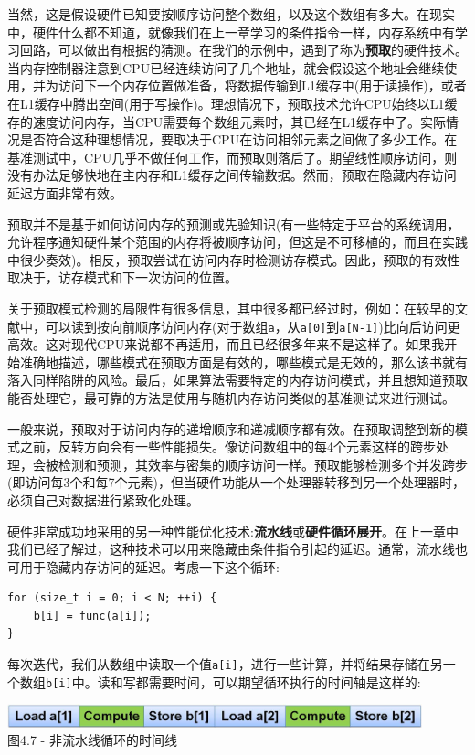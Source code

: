 当然，这是假设硬件已知要按顺序访问整个数组，以及这个数组有多大。在现实中，硬件什么都不知道，就像我们在上一章学习的条件指令一样，内存系统中有学习回路，可以做出有根据的猜测。在我们的示例中，遇到了称为\textbf{预取}的硬件技术。当内存控制器注意到CPU已经连续访问了几个地址，就会假设这个地址会继续使用，并为访问下一个内存位置做准备，将数据传输到L1缓存中(用于读操作)，或者在L1缓存中腾出空间(用于写操作)。理想情况下，预取技术允许CPU始终以L1缓存的速度访问内存，当CPU需要每个数组元素时，其已经在L1缓存中了。实际情况是否符合这种理想情况，要取决于CPU在访问相邻元素之间做了多少工作。在基准测试中，CPU几乎不做任何工作，而预取则落后了。期望线性顺序访问，则没有办法足够快地在主内存和L1缓存之间传输数据。然而，预取在隐藏内存访问延迟方面非常有效。

预取并不是基于如何访问内存的预测或先验知识(有一些特定于平台的系统调用，允许程序通知硬件某个范围的内存将被顺序访问，但这是不可移植的，而且在实践中很少奏效)。相反，预取尝试在访问内存时检测访存模式。因此，预取的有效性取决于，访存模式和下一次访问的位置。

关于预取模式检测的局限性有很多信息，其中很多都已经过时，例如：在较早的文献中，可以读到按向前顺序访问内存(对于数组\texttt{a}，从\texttt{a[0]}到\texttt{a[N-1]})比向后访问更高效。这对现代CPU来说都不再适用，而且已经很多年来不是这样了。如果我开始准确地描述，哪些模式在预取方面是有效的，哪些模式是无效的，那么该书就有落入同样陷阱的风险。最后，如果算法需要特定的内存访问模式，并且想知道预取能否处理它，最可靠的方法是使用与随机内存访问类似的基准测试来进行测试。

一般来说，预取对于访问内存的递增顺序和递减顺序都有效。在预取调整到新的模式之前，反转方向会有一些性能损失。像访问数组中的每4个元素这样的跨步处理，会被检测和预测，其效率与密集的顺序访问一样。预取能够检测多个并发跨步(即访问每3个和每7个元素)，但当硬件功能从一个处理器转移到另一个处理器时，必须自己对数据进行紧致化处理。

硬件非常成功地采用的另一种性能优化技术:\textbf{流水线}或\textbf{硬件循环展开}。在上一章中我们已经了解过，这种技术可以用来隐藏由条件指令引起的延迟。通常，流水线也可用于隐藏内存访问的延迟。考虑一下这个循环:

\begin{lstlisting}[style=styleCXX]
for (size_t i = 0; i < N; ++i) {
	b[i] = func(a[i]);
}
\end{lstlisting}

每次迭代，我们从数组中读取一个值\texttt{a[i]}，进行一些计算，并将结果存储在另一个数组\texttt{b[i]}中。读和写都需要时间，可以期望循环执行的时间轴是这样的:

\begin{center}
\includegraphics[width=0.9\textwidth]{content/1/chapter4/images/7.jpg}\\
图4.7 - 非流水线循环的时间线
\end{center}

